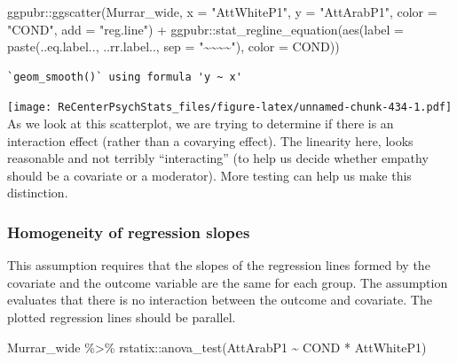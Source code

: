 \documentclass[
  11pt,
]{book}
\newenvironment{Shaded}{\begin{snugshade}}{\end{snugshade}}
\newcommand{\AttributeTok}[1]{\textcolor[rgb]{0.77,0.63,0.00}{#1}}
\newcommand{\FunctionTok}[1]{\textcolor[rgb]{0.00,0.00,0.00}{#1}}
\newcommand{\NormalTok}[1]{#1}
\newcommand{\SpecialCharTok}[1]{\textcolor[rgb]{0.00,0.00,0.00}{#1}}
\newcommand{\StringTok}[1]{\textcolor[rgb]{0.31,0.60,0.02}{#1}}
\begin{document}
\begin{Shaded}
\begin{Highlighting}[]
\NormalTok{ggpubr}\SpecialCharTok{::}\FunctionTok{ggscatter}\NormalTok{(Murrar\_wide, }\AttributeTok{x =} \StringTok{"AttWhiteP1"}\NormalTok{, }\AttributeTok{y =} \StringTok{"AttArabP1"}\NormalTok{, }\AttributeTok{color =} \StringTok{"COND"}\NormalTok{,}
    \AttributeTok{add =} \StringTok{"reg.line"}\NormalTok{) }\SpecialCharTok{+}\NormalTok{ ggpubr}\SpecialCharTok{::}\FunctionTok{stat\_regline\_equation}\NormalTok{(}\FunctionTok{aes}\NormalTok{(}\AttributeTok{label =} \FunctionTok{paste}\NormalTok{(..eq.label..,}
\NormalTok{    ..rr.label.., }\AttributeTok{sep =} \StringTok{"\textasciitilde{}\textasciitilde{}\textasciitilde{}\textasciitilde{}"}\NormalTok{), }\AttributeTok{color =}\NormalTok{ COND))}
\end{Highlighting}
\end{Shaded}

\begin{verbatim}
`geom_smooth()` using formula 'y ~ x'
\end{verbatim}

\texttt{[image: ReCenterPsychStats\_files/figure-latex/unnamed-chunk-434-1.pdf]}
As we look at this scatterplot, we are trying to determine if there is an interaction effect (rather than a covarying effect). The linearity here, looks reasonable and not terribly ``interacting'' (to help us decide whether empathy should be a covariate or a moderator). More testing can help us make this distinction.

\hypertarget{homogeneity-of-regression-slopes-1}{%
\subsubsection{Homogeneity of regression slopes}\label{homogeneity-of-regression-slopes-1}}

This assumption requires that the slopes of the regression lines formed by the covariate and the outcome variable are the same for each group. The assumption evaluates that there is no interaction between the outcome and covariate. The plotted regression lines should be parallel.

\begin{Shaded}
\begin{Highlighting}[]
\NormalTok{Murrar\_wide }\SpecialCharTok{\%\textgreater{}\%}
\NormalTok{    rstatix}\SpecialCharTok{::}\FunctionTok{anova\_test}\NormalTok{(AttArabP1 }\SpecialCharTok{\textasciitilde{}}\NormalTok{ COND }\SpecialCharTok{*}\NormalTok{ AttWhiteP1)}
\end{Highlighting}
\end{Shaded}
\end{document}

